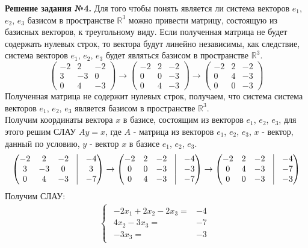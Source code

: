 \documentclass[a4paper, 12pt]{article}
\begin{document}
\vspace{0.5cm} 

\textbf{Решение задания №4.} Для того чтобы понять является ли система векторов $e_1$, $e_2$, $e_3$ базисом в пространстве $\mathbb{R}^3$ можно привести матрицу, состоящую из базисных векторов, к треугольному виду. Если полученная матрица не будет содержать нулевых строк, то вектора будут линейно независимы, как следствие, система векторов $e_1$, $e_2$, $e_3$ будет являться базисом в пространстве $\mathbb{R}^3$.
\[
\begin{pmatrix}
     -2 & 2 & -2 \\
     3 & -3 & 0 \\
     0 & 4 & -3
\end{pmatrix} \rightarrow
\begin{pmatrix}
     -2 & 2 & -2 \\
     0 & 0 & -3 \\
     0 & 4 & -3
\end{pmatrix} \rightarrow
\begin{pmatrix}
     -2 & 2 & -2 \\
     0 & 4 & -3 \\ 
     0 & 0 & -3 
\end{pmatrix} 
\]
Полученная матрица не содержит нулевых строк, получаем, что система система векторов $e_1$, $e_2$, $e_3$ является базисом в пространстве $\mathbb{R}^3$. \\ 

Получим координаты вектора $x$ в базисе, состоящим из векторов $e_1$, $e_2$, $e_3$, для этого решим СЛАУ $Ay=x$, где $A$ - матрица из векторов $e_1$, $e_2$, $e_3$, $x$ - вектор, данный по условию, $y$ - вектор $x$ в базисе $e_1$, $e_2$, $e_3$.
\[
\begin{pmatrix}
     -2 & 2 & -2 & \vrule & -4 \\
     3 & -3 & 0 & \vrule & 3 \\
     0 & 4 & -3 & \vrule & -7
\end{pmatrix} \rightarrow 
\begin{pmatrix}
-2 & 2 & -2 & \vrule & -4 \\
0 & 0 & -3 & \vrule & -3 \\
0 & 4 & -3 & \vrule & -7
\end{pmatrix} \rightarrow 
\begin{pmatrix}
-2 & 2 & -2 & \vrule & -4 \\
0 & 4 & -3 & \vrule & -7 \\
0 & 0 & -3 &\vrule & -3
\end{pmatrix}
\]
Получим СЛАУ:
\begin{gather*}
\begin{cases}
    \begin{aligned}
    -2x_1 +2x_2 -2x_3 =& -4 \\
     4x_2 - 3x_3 =& -7 \\
    -3 x_3 =& -3
    \end{aligned}
\end{cases} 
\end{gather*}
\end{document}
